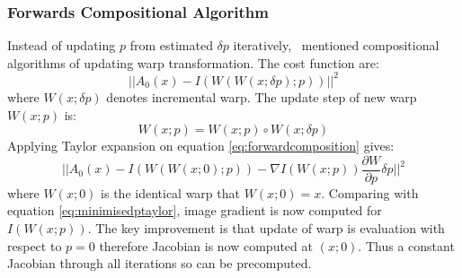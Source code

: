 \subsubsection{Forwards Compositional Algorithm}
\label{sec:fca}
Instead of updating $p$ from estimated $\delta p$ iteratively,~\cite{Matthews2004} mentioned compositional algorithms of updating warp transformation. The cost function are:
\begin{equation}
\label{eq:forwardcomposition}
||A_0(x)-I(W(W(x;\delta p);p))||^2
\end{equation}
where $W(x;\delta p)$ denotes incremental warp. The update step of new warp $W(x;p)$ is:
\begin{equation}
W(x;p) = W(x;p)\circ W(x;\delta p)
\end{equation}
Applying Taylor expansion on equation \ref{eq:forwardcomposition} gives:
\begin{equation}
\label{eq:forwardcompositiontaylor}
||A_0(x)-I(W(W(x;0);p))-\nabla I(W(x;p))\frac{\partial W}{\partial p}\delta p||^2
\end{equation}
where $W(x;0)$ is the identical warp that $W(x;0) = x$. Comparing with equation \ref{eq:minimisedptaylor}, image gradient is now computed for $I(W(x;p))$. The key improvement is that update of warp is evaluation with respect to $p=0$ therefore Jacobian is now computed at $(x;0)$. Thus a constant Jacobian through all iterations so can be precomputed.


